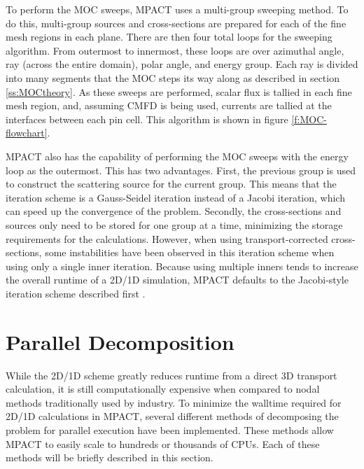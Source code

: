 To perform the MOC sweeps, MPACT uses a multi-group sweeping method.  To do this, multi-group sources and cross-sections are prepared for each of the fine mesh regions in each plane.  There are then four total loops for the sweeping algorithm.  From outermost to innermost, these loops are over azimuthal angle, ray (across the entire domain), polar angle, and energy group.  Each ray is divided into many segments that the MOC steps its way along as described in section \ref{ss:MOCtheory}.  As these sweeps are performed, scalar flux is tallied in each fine mesh region, and, assuming CMFD is being used, currents are tallied at the interfaces between each pin cell.  This algorithm is shown in figure \ref{f:MOC-flowchart}.

MPACT also has the capability of performing the MOC sweeps with the energy loop as the outermost.  This has two advantages.  First, the previous group is used to construct the scattering source for the current group.  This means that the iteration scheme is a Gauss-Seidel iteration instead of a Jacobi iteration, which can speed up the convergence of the problem.  Secondly, the cross-sections and sources only need to be stored for one group at a time, minimizing the storage requirements for the calculations.  However, when using transport-corrected cross-sections, some instabilities have been observed in this iteration scheme when using only a single inner iteration.  Because using multiple inners tends to increase the overall runtime of a 2D/1D simulation, MPACT defaults to the Jacobi-style iteration scheme described first .

\section{Parallel Decomposition}

While the 2D/1D scheme greatly reduces runtime from a direct 3D transport calculation, it is still computationally expensive when compared to nodal methods traditionally used by industry.  To minimize the walltime required for 2D/1D calculations in MPACT, several different methods of decomposing the problem for parallel execution have been implemented.  These methods allow MPACT to easily scale to hundreds or thousands of CPUs.  Each of these methods will be briefly described in this section.

